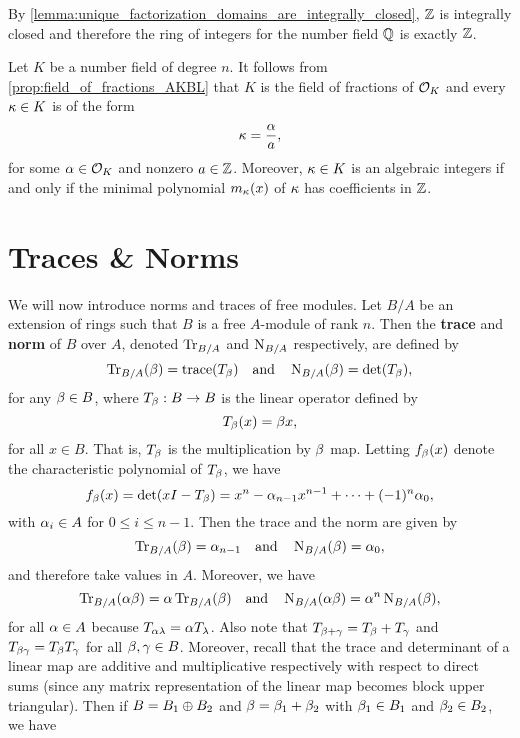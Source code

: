     \begin{remark}\label{rem:integers_are_integrally_closed}
      By \cref{lemma:unique_factorization_domains_are_integrally_closed}, $\mathbb{Z}$ is integrally closed and therefore the ring of integers for the number field $\mathbb{Q}$ is exactly $\mathbb{Z}$.
    \end{remark}

    Let $K$ be a number field of degree $n$. It follows from \cref{prop:field_of_fractions_AKBL} that $K$ is the field of fractions of $\mathcal{O}_{K}$ and every $\kappa \in K$ is of the form
    \[
      \kappa = \frac{\alpha}{a},
    \]
    for some $\alpha \in \mathcal{O}_{K}$ and nonzero $a \in \mathbb{Z}$. Moreover, $\kappa \in K$ is an algebraic integers if and only if the minimal polynomial $m_{\kappa}(x)$ of $\kappa$ has coefficients in $\mathbb{Z}$.
  \section{Traces \& Norms}
    We will now introduce norms and traces of free modules. Let $B/A$ be an extension of rings such that $B$ is a free $A$-module of rank $n$. Then the \textbf{trace} and \textbf{norm} of $B$ over $A$, denoted $\operatorname{\mathrm{Tr}}_{B/A}$ and $\operatorname{\mathrm{N}}_{B/A}$ respectively, are defined by
    \[
      \operatorname{\mathrm{Tr}}_{B/A}(\beta) = \operatorname{\mathrm{trace}}(T_{\beta}) \quad \text{and} \quad \operatorname{\mathrm{N}}_{B/A}(\beta) = \det(T_{\beta}),
    \]
    for any $\beta \in B$, where $T_{\beta}:B \to B$ is the linear operator defined by
    \[
      T_{\beta}(x) = \beta x,
    \]
    for all $x \in B$. That is, $T_{\beta}$ is the multiplication by $\beta$ map. Letting $f_{\beta}(x)$ denote the characteristic polynomial of $T_{\beta}$, we have
    \[
      f_{\beta}(x) = \det(xI-T_{\beta}) = x^{n}-\alpha_{n-1}x^{n-1}+\cdots+(-1)^{n}\alpha_{0},
    \]
    with $\alpha_{i} \in A$ for $0 \le i \le n-1$. Then the trace and the norm are given by
    \begin{equation}\label{equ:trace_and_norm_characteristic_polynomial}
      \operatorname{\mathrm{Tr}}_{B/A}(\beta) = \alpha_{n-1} \quad \text{and} \quad \operatorname{\mathrm{N}}_{B/A}(\beta) = \alpha_{0},
    \end{equation}
    and therefore take values in $A$. Moreover, we have
    \[
      \operatorname{\mathrm{Tr}}_{B/A}(\alpha\beta) = \alpha\operatorname{\mathrm{Tr}}_{B/A}(\beta) \quad \text{and} \quad \operatorname{\mathrm{N}}_{B/A}(\alpha\beta) = \alpha^{n}\operatorname{\mathrm{N}}_{B/A}(\beta),
    \]
    for all $\alpha \in A$ because $T_{\alpha\lambda} = \alpha T_{\lambda}$. Also note that $T_{\beta+\gamma} = T_{\beta}+T_{\gamma}$ and $T_{\beta\gamma} = T_{\beta}T_{\gamma}$ for all $\beta,\gamma \in B$. Moreover, recall that the trace and determinant of a linear map are additive and multiplicative respectively with respect to direct sums (since any matrix representation of the linear map becomes block upper triangular). Then if $B = B_{1} \oplus B_{2}$ and $\beta = \beta_{1}+\beta_{2}$ with $\beta_{1} \in B_{1}$ and $\beta_{2} \in B_{2}$, we have

